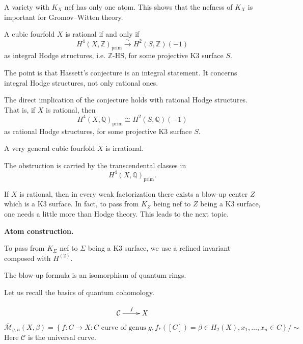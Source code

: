 A variety with $K_X$ nef has only one
atom.
This shows that the nefness of $K_X$
is important for Gromov--Witten
theory.

\begin{remark}
\label{remark-cubic-fourfold}
A cubic fourfold $X$ is rational if
and only if
\[
H^4(X,\mathbb{Z})_{\mathrm{prim}}
\overset{\sim}{\longrightarrow}
H^2(S,\mathbb{Z})(-1)
\]
as integral Hodge structures, i.e.
$\mathbb{Z}$-HS, for some
projective K3 surface $S$.
\end{remark}

\begin{remark}
\label{remark-point-hassett}
The point is that Hassett's conjecture
is an integral statement.
It concerns integral Hodge structures,
not only rational ones.
\end{remark}

\begin{theorem}
\label{theorem-direct-implication}
The direct implication of the
conjecture holds with rational Hodge
structures.
That is, if $X$ is rational, then
\[
H^4(X,\mathbb{Q})_{\mathrm{prim}}
\cong
H^2(S,\mathbb{Q})(-1)
\]
as rational Hodge structures, for some
projective K3 surface $S$.
\end{theorem}

\begin{lemma}[KKPY]
\label{lemma-very-general}
A very general cubic fourfold $X$ is
irrational.
\end{lemma}

The obstruction is carried by the
transcendental classes in
\[
H^4(X,\mathbb{Q})_{\mathrm{prim}}.
\]

\begin{remark}
\label{remark-x-rational}
If $X$ is rational, then in every weak
factorization there exists a blow-up
center $Z$ which is a K3 surface.
In fact, to pass from $K_Z$ being nef
to $Z$ being a K3 surface, one needs a
little more than Hodge theory.
This leads to the next topic.
\end{remark}

\medskip\noindent
{\bf Atom construction.}

To pass from $K_\Sigma$ nef to
$\Sigma$ being a K3 surface, we use a
refined invariant composed with
$H^{(2)}$.

The blow-up formula is an isomorphism
of quantum rings.

Let us recall the basics of quantum
cohomology.

$$
\xymatrix{
\mathcal C \ar[r]^f & X
}
$$
\[
\overline{\mathcal M}_{g,n}(X,\beta)=
\left\{
f:
C\to X:
C \text{ curve of genus } g,
f_*([C])=\beta\in H_2(X),
x_1,\dots,x_n\in C
\right\}/\sim
\]
Here $\mathcal C$ is the universal
curve.

